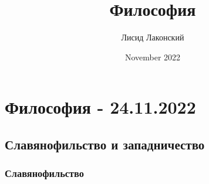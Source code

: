 \documentclass{article}
\title{Философия}
\author{Лисид Лаконский}
\date{November 2022}
\begin{document}
\maketitle
\tableofcontents
\pagebreak

\section{Философия - 24.11.2022}

\subsection{Славянофильство и западничество}

\subsubsection{Славянофильство}
\end{document}

